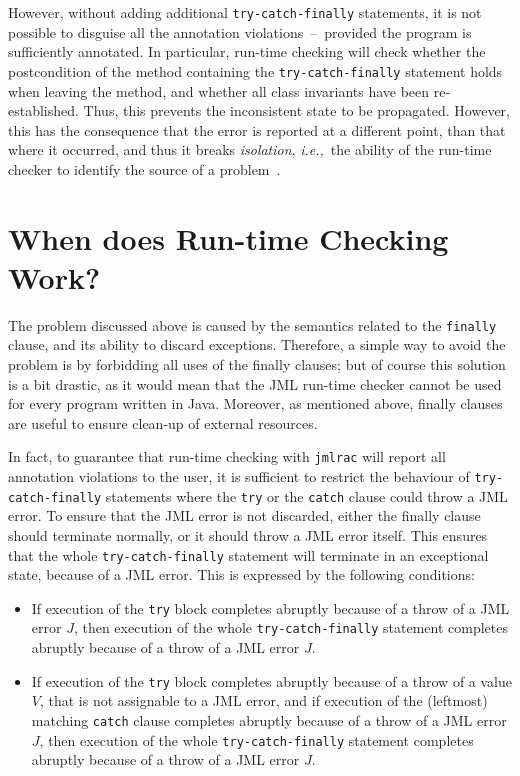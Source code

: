 \documentclass[]{llncs}
\begin{document}
However, without adding additional \texttt{try-catch-finally}
statements, it is not possible to disguise all the annotation
violations~--~provided the program is sufficiently annotated. In
particular, run-time checking will check whether the postcondition of
the method containing the \texttt{try-catch-finally} statement holds
when leaving the method, and whether all class invariants have been
re-established. Thus, this prevents the inconsistent state to be
propagated. However, this has the consequence that the error is
reported at a different point, than that where it occurred, and thus
it breaks \emph{isolation}, \emph{i.e.,}\ the ability of the run-time
checker to identify the source of a problem~\cite{BurdyCCEKLLP03}.

\section{When does Run-time Checking Work?}\label{SecAvoiding} 

The problem discussed above is caused by the semantics related to the
\texttt{finally} clause, and its ability to discard
exceptions. Therefore, a simple way to avoid the problem is by
forbidding all uses of the finally clauses; but of course this
solution is a bit drastic, as it would mean that the JML run-time checker
cannot be used for every program written in Java. Moreover, as
mentioned above, finally clauses are useful to ensure clean-up of
external resources. 

In fact, to guarantee that run-time checking with \texttt{jmlrac} will
report all annotation violations to the user, it is sufficient to
restrict the behaviour of \texttt{try-catch-finally} statements where
the \texttt{try} or the \texttt{catch} clause could throw a JML
error. To ensure that the JML error is not discarded, either the
finally clause should terminate normally, or it should throw a JML
error itself. This ensures that the whole \texttt{try-catch-finally}
statement will terminate in an exceptional state, because of a JML
error. This is expressed by the following conditions: 

\begin{itemize}
\item If execution of the \texttt{try} block completes abruptly 
because of a throw of a JML error \(J\), then execution of the whole
\texttt{try-catch-finally} statement completes abruptly because of a 
throw of a JML error \(J\).
\item If execution of the \texttt{try} block completes abruptly
because of a throw of a value \(V\), that is not assignable to a JML
error, and if execution of the (leftmost) matching \texttt{catch}
clause completes abruptly because of a throw of a JML error \(J\),
then execution of the whole \texttt{try-catch-finally} statement
completes abruptly because of a throw of a JML error \(J\).
\end{itemize}
\end{document}
